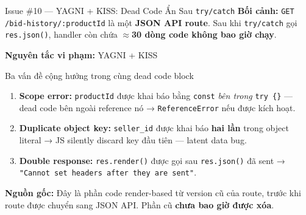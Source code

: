 \documentclass[12pt]{beamer}
\begin{document}
\begin{frame}[fragile]{Issue \#10 — YAGNI + KISS: Dead Code Ẩn Sau \texttt{try/catch}}
  \textbf{Bối cảnh:} \texttt{GET /bid-history/:productId} là một \textbf{JSON API route}. Sau khi \texttt{try/catch} gọi \texttt{res.json()}, handler còn chứa \textbf{$\approx$30 dòng code không bao giờ chạy}.

  \bigskip
  \textbf{Nguyên tắc vi phạm:} \alert{YAGNI} + \alert{KISS}

  \bigskip
  \begin{alertblock}{Ba vấn đề cộng hưởng trong cùng dead code block}
    \begin{enumerate}
      \item \textbf{Scope error:} \texttt{productId} được khai báo bằng \texttt{const} \emph{bên trong} \texttt{try \{\}} — dead code bên ngoài reference nó → \texttt{ReferenceError} nếu được kích hoạt.
      \item \textbf{Duplicate object key:} \texttt{seller\_id} được khai báo \textbf{hai lần} trong object literal → JS silently discard key đầu tiên — latent data bug.
      \item \textbf{Double response:} \texttt{res.render()} được gọi sau \texttt{res.json()} đã sent → \texttt{"Cannot set headers after they are sent"}.
    \end{enumerate}
  \end{alertblock}

  \bigskip
  \textbf{Nguồn gốc:} Đây là phần code render-based từ version cũ của route, trước khi route được chuyển sang JSON API. Phần cũ \textbf{chưa bao giờ được xóa}.
\end{frame}
\end{document}
